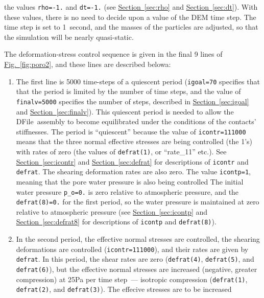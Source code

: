 \documentclass[letterpaper,11pt]{article}
\newcommand{\DFile}{\textsf{DFile}}
\begin{document}
the values \texttt{rho=-1.} and \texttt{dt=-1.}
(see \hyperref[sec:rho]{Section~\ref*{sec:rho}}
and \hyperref[sec:dt]{Section~\ref*{sec:dt}}).
With these values, there is no need to decide upon
a value of the DEM time step.
The time step is set to 1~second,
and the masses of the particles are adjusted,
so that the simulation will be nearly
quasi-static.
%
\par
%
The deformation-stress control sequence is given
in the final 9 lines of 
\hyperref[fig:poro2]{Fig.~\ref*{fig:poro2}},
and these lines are described belowa:
\begin{enumerate}
\item
The first line is 5000 time-steps of a
quiescent period (\texttt{igoal=70} specifies that that
the period is limited by the number of time steps,
and the value of \texttt{finalv=5000} specifies
the number of steps,
described in
\hyperref[sec:igoal]{Section~\ref*{sec:igoal}} and
\hyperref[sec:finalv]{Section~\ref*{sec:finalv}}).
This quiescent period is needed to allow the
\DFile\ assembly to become equilibrated under the
conditions of the contacts' stiffnesses.
The period is ``quiescent'' because the value
of \texttt{icontr=111000} means that the three normal
effective
stresses are being controlled (the 1's) with
rates of zero (the values of
\texttt{defrat(1)}, or ``rate\_11'' etc.).
See \hyperref[sec:icontr]{Section~\ref*{sec:icontr}} and
\hyperref[sec:defrat]{Section~\ref*{sec:defrat}} for
descriptions of \texttt{icontr} and \texttt{defrat}.
The shearing deformation rates are also zero.
The value \texttt{icontp=1}, meaning that
the pore water pressure is also being controlled
The initial water pressure \texttt{p\_o=0.} is zero
relative to atmospheric pressure,
and the \texttt{defrat(8)=0.} for the first period,
so the water pressure is maintained at zero
relative to atmospheric pressure
(see \hyperref[sec:icontp]{Section~\ref*{sec:icontp}} and
\hyperref[sec:defrat8]{Section~\ref*{sec:defrat8}}
for descriptions
of \texttt{icontp} and \texttt{defrat(8)}).
%
\item
In the second period,
the effective normal stresses are controlled,
the shearing deformations are controlled
(\texttt{icontr=111000}), and their rates are given by
\texttt{defrat}.
In this period, the shear rates are zero
(\texttt{defrat(4)}, \texttt{defrat(5)},
and \texttt{defrat(6)}),
but the effective normal stresses are increased
(negative, greater compression) at 25Pa per time
step~--- isotropic compression
(\texttt{defrat(1)}, \texttt{defrat(2)},
and \texttt{defrat(3)}).
The effecive stresses are to be increased

\end{enumerate}
\end{document}
